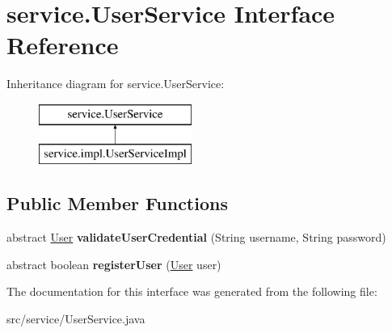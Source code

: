\hypertarget{interfaceservice_1_1_user_service}{}\section{service.\+User\+Service Interface Reference}
\label{interfaceservice_1_1_user_service}
Inheritance diagram for service.\+User\+Service\+:\begin{figure}[H]
\begin{center}
\leavevmode
\includegraphics[height=2.000000cm]{interfaceservice_1_1_user_service}
\end{center}
\end{figure}
\subsection*{Public Member Functions}
\begin{DoxyCompactItemize}
\item 
\mbox{\label{interfaceservice_1_1_user_service_a34e74aa724e499073f3c3051e8ff8e42}} 
abstract \mbox{\hyperlink{classmodel_1_1_user}{User}} {\bfseries validate\+User\+Credential} (String username, String password)
\item 
\mbox{\label{interfaceservice_1_1_user_service_a111804c2062b3d6f948ef550051a5ad3}} 
abstract boolean {\bfseries register\+User} (\mbox{\hyperlink{classmodel_1_1_user}{User}} user)
\end{DoxyCompactItemize}


The documentation for this interface was generated from the following file\+:\begin{DoxyCompactItemize}
\item 
src/service/User\+Service.\+java\end{DoxyCompactItemize}
